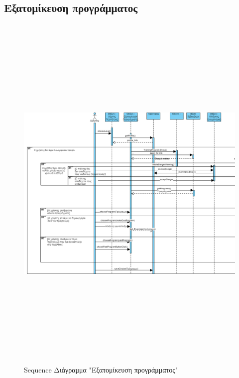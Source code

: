 \subsection{Εξατομίκευση προγράμματος}
\begin{figure}[!htb]
\begin{center}
    \includegraphics[width=\textwidth,height=18cm]{sequence_eksatom.png}
    \caption{Sequence Διάγραμμα "Εξατομίκευση προγράμματος"}
    \label{}
    \end{center}
\end{figure}
\newpage

